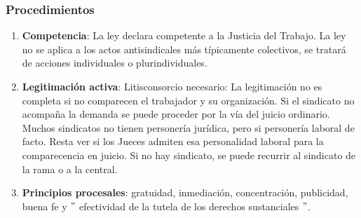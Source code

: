 \documentclass[spanish,12pt,a4paper,titlepage]{report}
\begin{document}
\subsubsection{Procedimientos}
\begin{enumerate}
\item \textbf{Competencia}: La ley declara competente a la Justicia del Trabajo. La ley no se aplica a los actos antisindicales más típicamente colectivos, se tratará de acciones individuales o plurindividuales.
\item \textbf{Legitimación activa}: Litisconsorcio necesario: La legitimación no es completa si no comparecen el trabajador y su organización. Si el sindicato no acompaña la demanda se puede proceder por la vía del juicio ordinario. Muchos sindicatos no tienen personería jurídica, pero si personería laboral de facto. Resta ver si los Jueces admiten esa personalidad laboral para la comparecencia en juicio. Si no hay sindicato, se puede recurrir al sindicato de la rama o a la central.

\item \textbf{Principios procesales}: gratuidad, inmediación, concentración, publicidad, buena fe y $"$ efectividad de la tutela de los derechos sustanciales $"$.


\end{enumerate}
\end{document}
